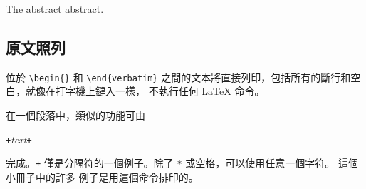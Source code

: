 \newenvironment{abstract}%
        {\begin{center}\begin{small}\begin{minipage}{0.8\textwidth}}%
        {\end{minipage}\end{small}\end{center}}
\begin{example}
\begin{abstract}
The abstract abstract.
\end{abstract}
\end{example}

\subsection{原文照列}

位於 \verb|\begin{|\verb|}| 和 \verb|\end{verbatim}| 
之間的文本將直接列印，包括所有的斷行和空白，就像在打字機上鍵入一樣，
不執行任何 \LaTeX{} 命令。

在一個段落中，類似的功能可由
\begin{lscommand}
\verb|+|\emph{text}\verb|+|
\end{lscommand}
\noindent 完成。\verb|+| 僅是分隔符的一個例子。除了 \verb|*| 
或空格，可以使用任意一個字符。 這個小冊子中的許多%
例子是用這個命令排印的。


